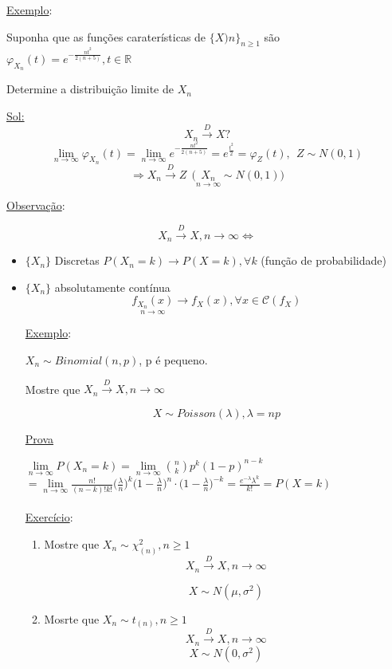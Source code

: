 \documentclass[a4paper,12pt]{article}
\begin{document}
\begin{enumerate}[label =\arabic*)]
		\underline{Exemplo}:
		
		Suponha que as funções caraterísticas de $\{X)n\}_{n\ge 1}$ são $\varphi_{X_n}(t) =e^{-\frac{nt^2}{2(n+5)}}, t\in \mathbb R$
		
		Determine a distribuição limite de $X_n$
		
		\underline{Sol:}
		$$X_n \overset{D}{\longrightarrow} X? $$
		$$\lim\limits_{n\rightarrow \infty} \varphi_{X_n}(t) = \lim\limits_{n\rightarrow \infty}  e^{-\frac{nt^2}{2(n+5)}} = e^{\frac{t^2}{2}}
		=\varphi_Z(t), \ \ Z\sim N(0,1)
		$$
		$$\Rightarrow X_n \overset{D}{\longrightarrow} Z \ \ \bigg(\underset{n\rightarrow \infty}{X_n} \sim N(0,1) \bigg) $$
		
		\underline{Observação}:
		
		$$X_n \overset{D}{\longrightarrow}  X, n\rightarrow \infty  \Leftrightarrow $$
		\begin{itemize}
			\item $\{X_n\}$ Discretas
			$P(X_n=k)\rightarrow P(X=k),\forall k $ (função de probabilidade)
	\item $\{X_n\}$ absolutamente contínua
	$$\underset{n\rightarrow \infty}{f_{X_n}(x)} \rightarrow f_X(x), \forall x \in \mathscr C(f_X) $$
	\newpage 
	
	\underline{Exemplo}:
	
	$X_n \sim Binomial(n,p)$, p é pequeno.
	
	Mostre que $X_n \overset{D}{\longrightarrow}  X, n\rightarrow \infty $
	
	$$X\sim Poisson(\lambda), \lambda = np$$
	
	\underline{Prova}
	
	$\lim\limits_{n\rightarrow \infty}  P(X_n=k) = \lim\limits_{n\rightarrow \infty} \binom{n}{k}p^k(1-p)^{n-k}$\\
	$=
	\lim\limits_{n\rightarrow \infty}  \frac{n!}{(n-k)!k!}\bigg(\frac{\lambda}{n} \bigg)^k\bigg(
	1-\frac{\lambda }{n}
	\bigg)^n\cdot \bigg(1-\frac{\lambda}{n} \bigg)^{-k} = \frac{e^{-\lambda} \lambda^k}{k!} = P(X=k)
	$\\
	\\
	\underline{Exercício}: 
	\begin{enumerate}
		\item 

	Mostre que $X_n\sim\chi_{(n)}^2, n\ge 1$
	$$X_n\overset{D}{\longrightarrow} X, n\rightarrow \infty $$
	
	
	$$X\sim N(\mu ,\sigma^2) $$
\item Mosrte que $X_n \sim t_{(n)},n\ge 1$
$$X_n\overset{D}{\longrightarrow} X, n\rightarrow \infty $$
$$X\sim N(0,\sigma^2) $$
	

\end{enumerate}
\end{itemize}
\end{enumerate}
\end{document}
